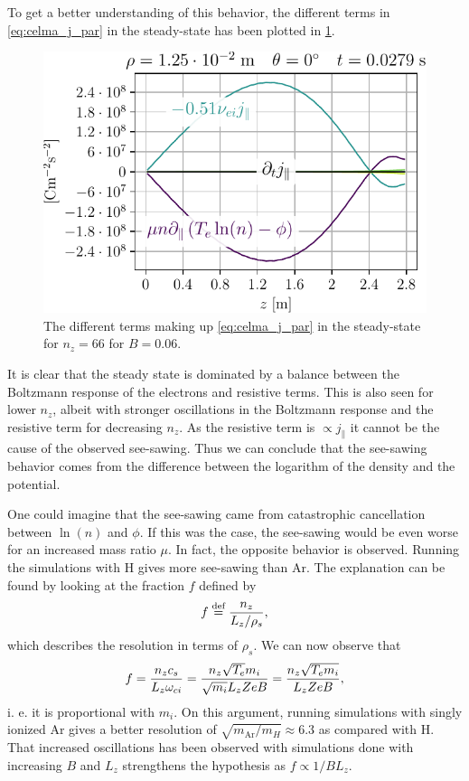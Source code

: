 \noindent
To get a better understanding of this behavior, the different terms in \cref{eq:celma_j_par} in the steady-state has been plotted in \cref{fig:jParBalance}.
%
\begin{figure}[htb]
    \centering
    \includegraphics{fig/results/jParBalanceNy66}
    \caption{The different terms making up \cref{eq:celma_j_par} in the steady-state for $n_z=66$ for $B=0.06$.
    }
    \label{fig:jParBalance}
\end{figure}
%
It is clear that the steady state is dominated by a balance between the Boltzmann response of the electrons and resistive terms.
This is also seen for lower $n_z$, albeit with stronger oscillations in the Boltzmann response and the resistive term for decreasing $n_z$.
As the resistive term is $\propto j_\|$ it cannot be the cause of the observed see-sawing.
Thus we can conclude that the see-sawing behavior comes from the difference between the logarithm of the density and the potential.

One could imagine that the see-sawing came from catastrophic cancellation between $\ln(n)$ and $\phi$.
If this was the case, the see-sawing would be even worse for an increased mass ratio $\mu$.
In fact, the opposite behavior is observed.
Running the simulations with $\text{H}$ gives more see-sawing than $\text{Ar}$.
The explanation can be found by looking at the fraction $f$ defined by
%
\begin{align}
    f \overset{\text{def}}{=} \frac{n_z}{L_z/\rho_s},
    \label{fig:defF}
\end{align}
%
which describes the resolution in terms of $\rho_s$.
We can now observe that
%
\begin{align*}
  f = \frac{n_zc_s}{L_z \omega_{ci}}
    = \frac{n_z\sqrt{T_e}m_i}{\sqrt{m_i} L_z ZeB}
    = \frac{n_z\sqrt{T_em_i}}{L_z ZeB},
\end{align*}
%
i. e. it is proportional with $m_i$.
On this argument, running simulations with singly ionized $\text{Ar}$ gives a better resolution of $\sqrt{m_{\text{Ar}}/m_H}\approx6.3$ as compared with $\text{H}$.
That increased oscillations has been observed with simulations done with increasing $B$ and $L_z$ strengthens the hypothesis as $f\propto 1/BL_z$.


